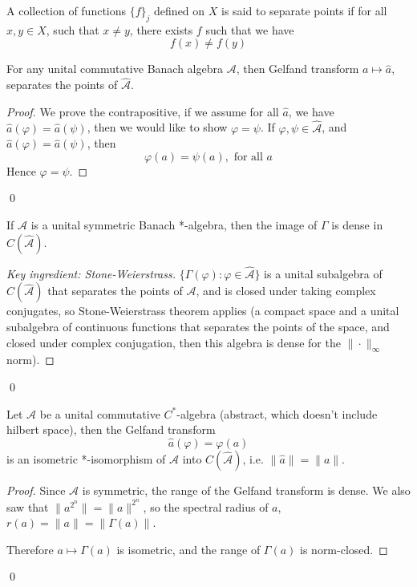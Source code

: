\begin{definition}
    A collection of functions $\{f\}_j$ defined on $X$ is said to separate points if for all $x,y\in X$, such that $x\neq y$, there exists $f$ such that we have
    \begin{equation*}
        f(x)\neq f(y)
    \end{equation*}
\end{definition}
\begin{proposition}
    For any unital commutative Banach algebra $\mathcal{A}$, then Gelfand transform $a\mapsto\widehat{a}$, separates the points of $\widehat{\mathcal{A}}$.
\end{proposition}
\begin{proof}
    We prove the contrapositive, if we assume for all $\widehat{a}$, we have $\widehat{a}(\varphi)=\widehat{a}(\psi)$, then we would like to show $\varphi=\psi$.
    If $\varphi,\psi\in\widehat{\mathcal{A}}$, and $\widehat{a}(\varphi)=\widehat{a}(\psi)$, then 
    \begin{equation*}
        \varphi(a)=\psi(a), \text{ for all } a
    \end{equation*}
    Hence $\varphi=\psi$.
\end{proof}
\qed

\begin{proposition}
    If $\mathcal{A}$ is a unital symmetric Banach *-algebra, then the image of $\Gamma$ is dense in $C(\widehat{\mathcal{A}})$.
\end{proposition}
\begin{proof}[Key ingredient: Stone-Weierstrass]
    $\{\Gamma(\varphi):\varphi\in\widehat{\mathcal{A}}\}$ is a unital subalgebra of $C(\widehat{\mathcal{A}})$ that separates the points of $\mathcal{A}$, and is closed under taking complex conjugates, so Stone-Weierstrass theorem applies (a compact space and a unital subalgebra of continuous functions that separates the points of the space, and closed under complex conjugation, then this algebra is dense for the $\|\cdot\|_\infty$ norm).
\end{proof}
\qed

\begin{theorem}
    Let $\mathcal{A}$ be a unital commutative $C^*$-algebra (abstract, which doesn't include hilbert space), then the Gelfand transform
    \begin{equation*}
        \widehat{a}(\varphi)=\varphi(a)
    \end{equation*}
    is an isometric *-isomorphism of $\mathcal{A}$ into $C(\widehat{\mathcal{A}})$, i.e. $\|\widehat{a}\|=\|a\|$.   
\end{theorem}
\begin{proof}
    Since $\mathcal{A}$ is symmetric, the range of the Gelfand transform is dense. We also saw that $\|a^{2^n}\|=\|a\|^{2^n}$, so the spectral radius of $a$, $r(a)=\|a\|=\|\Gamma(a)\|$. 

    Therefore $a\mapsto\Gamma(a)$ is isometric, and the range of $\Gamma(a)$ is norm-closed.
\end{proof}
\qed

